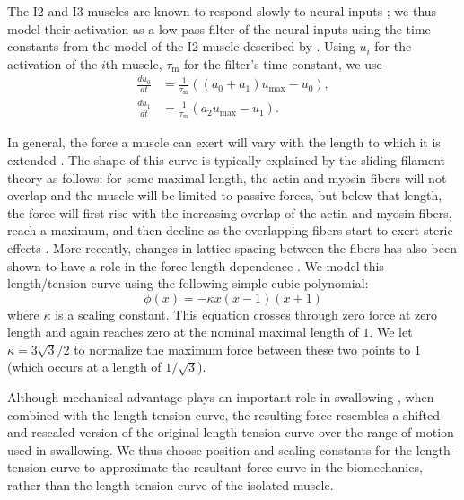 The I2 and I3 muscles are known to respond slowly to neural inputs
\citep{yu_biomechanical_1999}; we thus model their activation as a
low-pass filter of the neural inputs using the time constants from the model of
the I2 muscle described by \citet{yu_biomechanical_1999}.  Using $u_i$
for the activation of the $i$th muscle, $\tau_\textrm{m}$ for the filter's time
constant, we use
\begin{align}
    \frac{du_0}{dt} &= \frac{1}{\tau_\textrm{m}}((a_0 + a_1)u_\textrm{max} - u_0),\\
    \frac{du_1}{dt} &= \frac{1}{\tau_\textrm{m}}(a_2 u_\textrm{max} - u_1).
\end{align}

In general, the force a muscle can exert will vary with the length to which it
is extended \citep{zajac_muscle_1989,fox_serotonin_1997}.  The shape of this
curve is typically explained by the sliding filament theory as follows: for
some maximal length, the actin and myosin fibers will not overlap and the
muscle will be limited to passive forces, but below that length, the force will
first rise with the increasing overlap of the actin and myosin fibers, reach a
maximum, and then decline as the overlapping fibers start to exert steric
effects \citep{gordon_variation_1966}.  More recently, changes in lattice
spacing between the fibers has also been shown to have a role in the
force-length dependence \citep{williams_lengthtension_2013}.  We model this
length/tension curve using the following simple cubic polynomial:
\begin{equation}
    \phi(x) = -\kappa x (x - 1) (x + 1)
\end{equation}
where $\kappa$ is a scaling constant.  This equation crosses through zero force
at zero length and again reaches zero at the nominal maximal length of $1$.
We let $\kappa = 3\sqrt{3}/2$ to normalize the maximum force between these
two points to $1$ (which occurs at  a length of $1/\sqrt{3}$).

Although mechanical advantage plays an important role in swallowing
\citep{sutton_neural_2004,novakovic_mechanical_2006}, when combined with the
length tension curve, the resulting force resembles a shifted and rescaled
version of the original length tension curve over the range of motion used in
swallowing.  We thus choose position and scaling constants for the
length-tension curve to approximate the resultant force curve in the
biomechanics, rather than the length-tension curve of the isolated muscle.

